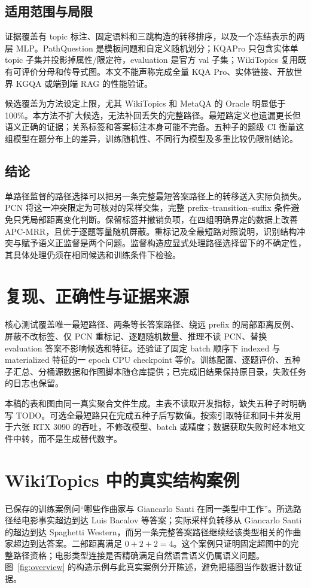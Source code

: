 \documentclass[UTF8,a4paper,10pt,fontset=fandol]{ctexart}
\begin{document}
\subsection{适用范围与局限}
证据覆盖有 topic 标注、固定语料和三跳构造的转移排序，以及一个冻结表示的两层 MLP。PathQuestion 是模板问题和自定义随机划分；KQAPro 只包含实体单 topic 子集并投影掉属性/限定符，evaluation 是官方 val 子集；WikiTopics 复用既有可评价分母和传导式图。本文不能声称完成全量 KQA Pro、实体链接、开放世界 KGQA 或端到端 RAG 的性能验证。

候选覆盖为方法设定上限，尤其 WikiTopics 和 MetaQA 的 Oracle 明显低于 100\%。本方法不扩大候选，无法补回丢失的完整路径。最短路定义也遗漏更长但语义正确的证据；关系标签和答案标注本身可能不完备。五种子的题级 CI 衡量这组模型在题分布上的差异，训练随机性、不同行为模型及多重比较仍限制结论。

\subsection{结论}
单路径监督的路径选择可以把另一条完整最短答案路径上的转移送入实际负损失。PCN 将这一冲突限定为可核对的采样交集，完整 prefix--transition--suffix 条件避免只凭局部距离变化判断。保留标签并撤销负项，在四组明确界定的数据上改善 APC-MRR，且优于逐题等量随机屏蔽。重标记及全最短路对照说明，识别结构冲突与赋予语义正监督是两个问题。监督构造应显式处理路径选择留下的不确定性，其具体处理仍须在相同候选和训练条件下检验。

\appendix
\section{复现、正确性与证据来源}
核心测试覆盖唯一最短路径、两条等长答案路径、绕远 prefix 的局部距离反例、屏蔽不改标签、仅 PCN 重标记、逐题随机数量、推理不读 PCN、替换 evaluation 答案不影响候选和特征。还验证了固定 batch 顺序下 indexed 与 materialized 特征的一 epoch CPU checkpoint 等价。训练配置、逐题评价、五种子汇总、分桶源数据和作图脚本随仓库提供；已完成旧结果保持原目录，失败任务的日志也保留。

本稿的表和图由同一真实聚合文件生成。主表不读取开发指标，缺失五种子时明确写 TODO。可选全最短路只在完成五种子后写数值。按索引取特征和同卡并发用于六张 RTX 3090 的吞吐，不修改模型、batch 或精度；数据获取失败时经本地文件中转，而不是生成替代数字。

\section{WikiTopics 中的真实结构案例}
已保存的训练案例问“哪些作曲家与 Giancarlo Santi 在同一类型中工作”。所选路径经电影事实超边到达 Luis Bacalov 等答案；实际采样负转移从 Giancarlo Santi 的超边到达 Spaghetti Western，而另一条完整答案路径继续经该类型相关的作曲家超边到达答案。二部距离满足 $0+2+2=4$。这个案例只证明固定超图中的完整路径资格；电影类型连接是否精确满足自然语言语义仍属语义问题。图~\ref{fig:overview} 的构造示例与此真实案例分开陈述，避免把插图当作数据计数证据。
\end{document}
